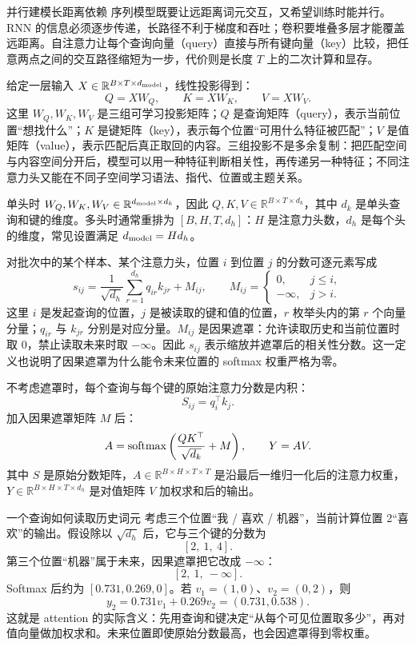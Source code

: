 \begin{motivationbox}{并行建模长距离依赖}
序列模型既要让远距离词元交互，又希望训练时能并行。RNN 的信息必须逐步传递，长路径不利于梯度和吞吐；卷积要堆叠多层才能覆盖远距离。自注意力让每个查询向量（query）直接与所有键向量（key）比较，把任意两点之间的交互路径缩短为一步，代价则是长度 $T$ 上的二次计算和显存。
\end{motivationbox}

给定一层输入 $X\in\mathbb R^{B\times T\times d_{\rm model}}$，线性投影得到：
\[
Q=XW_Q,\qquad K=XW_K,\qquad V=XW_V.
\]
这里 $W_Q,W_K,W_V$ 是三组可学习投影矩阵；$Q$ 是查询矩阵（query），表示当前位置“想找什么”；$K$ 是键矩阵（key），表示每个位置“可用什么特征被匹配”；$V$ 是值矩阵（value），表示匹配后真正取回的内容。三组投影不是多余复制：把匹配空间与内容空间分开后，模型可以用一种特征判断相关性，再传递另一种特征；不同注意力头又能在不同子空间学习语法、指代、位置或主题关系。

单头时 $W_Q,W_K,W_V\in\mathbb R^{d_{\rm model}\times d_k}$，因此 $Q,K,V\in\mathbb R^{B\times T\times d_k}$，其中 $d_k$ 是单头查询和键的维度。多头时通常重排为 $[B,H,T,d_h]$：$H$ 是注意力头数，$d_h$ 是每个头的维度，常见设置满足 $d_{\rm model}=H d_h$。

对批次中的某个样本、某个注意力头，位置 $i$ 到位置 $j$ 的分数可逐元素写成
\[
s_{ij}=\frac{1}{\sqrt{d_h}}\sum_{r=1}^{d_h}q_{ir}k_{jr}+M_{ij},
\qquad
M_{ij}=\begin{cases}
0,&j\le i,\\
-\infty,&j>i.
\end{cases}
\]
这里 $i$ 是发起查询的位置，$j$ 是被读取的键和值的位置，$r$ 枚举头内的第 $r$ 个向量分量；$q_{ir}$ 与 $k_{jr}$ 分别是对应分量。$M_{ij}$ 是因果遮罩：允许读取历史和当前位置时取 $0$，禁止读取未来时取 $-\infty$。因此 $s_{ij}$ 表示缩放并遮罩后的相关性分数。这一定义也说明了因果遮罩为什么能令未来位置的 softmax 权重严格为零。

\figSelfAttention

不考虑遮罩时，每个查询与每个键的原始注意力分数是内积：
\[
S_{ij}=q_i^\top k_j.
\]
加入因果遮罩矩阵 $M$ 后：
\[
A=\operatorname{softmax}\left(\frac{QK^\top}{\sqrt{d_k}}+M\right),\qquad Y=AV.
\]
其中 $S$ 是原始分数矩阵，$A\in\mathbb R^{B\times H\times T\times T}$ 是沿最后一维归一化后的注意力权重，$Y\in\mathbb R^{B\times H\times T\times d_h}$ 是对值矩阵 $V$ 加权求和后的输出。

\begin{examplebox}{一个查询如何读取历史词元}
考虑三个位置“我 / 喜欢 / 机器”，当前计算位置 2“喜欢”的输出。假设除以 $\sqrt{d_h}$ 后，它与三个键的分数为
\[
[2,\ 1,\ 4].
\]
第三个位置“机器”属于未来，因果遮罩把它改成 $-\infty$：
\[
[2,\ 1,\ -\infty].
\]
Softmax 后约为 $[0.731,0.269,0]$。若 $v_1=(1,0)$、$v_2=(0,2)$，则
\[
y_2=0.731v_1+0.269v_2=(0.731,0.538).
\]
这就是 attention 的实际含义：先用查询和键决定“从每个可见位置取多少”，再对值向量做加权求和。未来位置即使原始分数最高，也会因遮罩得到零权重。
\end{examplebox}

